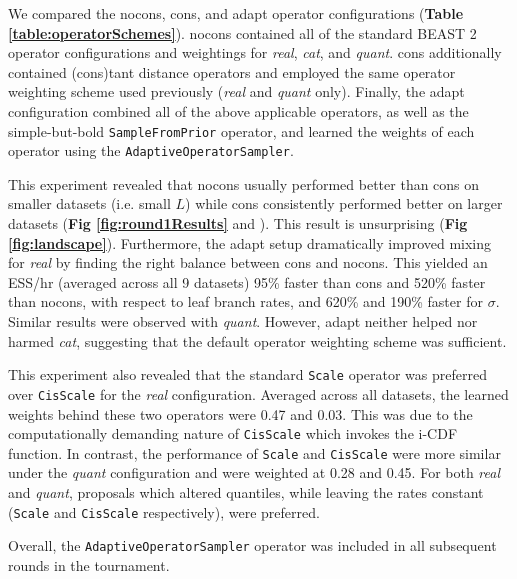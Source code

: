 \documentclass[10pt,letterpaper]{article}
\begin{document}
We compared the nocons, cons, and adapt operator configurations (\textbf{Table \ref{table:operatorSchemes}}).
nocons contained all of the standard BEAST 2 operator configurations and weightings for \textit{real}, \textit{cat}, and \textit{quant}.
cons additionally contained (cons)tant distance operators and employed the same operator weighting scheme used previously \cite{zhang2020improving} (\textit{real} and \textit{quant} only). 
Finally, the adapt configuration combined all of the above applicable operators, as well as the simple-but-bold \texttt{SampleFromPrior} operator, and learned the weights of each operator using the  \texttt{AdaptiveOperatorSampler}.




This experiment revealed that nocons usually performed better than cons on smaller datasets (i.e. small $L$) while cons consistently performed better on larger datasets (\textbf{Fig \ref{fig:round1Results}} and \textbf{}). 
This result is unsurprising (\textbf{Fig \ref{fig:landscape}}).
Furthermore, the adapt setup dramatically improved mixing for \textit{real} by finding the right balance between cons and nocons.
This yielded an ESS/hr (averaged across all 9 datasets) 95\% faster than cons and 520\% faster than nocons, with respect to leaf branch rates, and 620\% and 190\% faster for $\sigma$.
Similar results were observed with \textit{quant}.
However, adapt neither helped nor harmed \textit{cat}, suggesting that the default operator weighting scheme was sufficient.


This experiment also revealed that the standard \texttt{Scale} operator was preferred over \texttt{CisScale} for the \textit{real} configuration. Averaged across all datasets, the learned weights behind these two operators were 0.47 and 0.03.
This was due to the computationally demanding nature of \texttt{CisScale} which invokes the i-CDF function.
In contrast, the performance of \texttt{Scale} and \texttt{CisScale} were more similar under the \textit{quant} configuration and were weighted at 0.28 and 0.45.
For both \textit{real} and \textit{quant}, proposals which altered quantiles, while leaving the rates constant (\texttt{Scale} and \texttt{CisScale} respectively), were preferred.


Overall, the \texttt{AdaptiveOperatorSampler} operator was included in all subsequent rounds in the tournament. 
\end{document}
